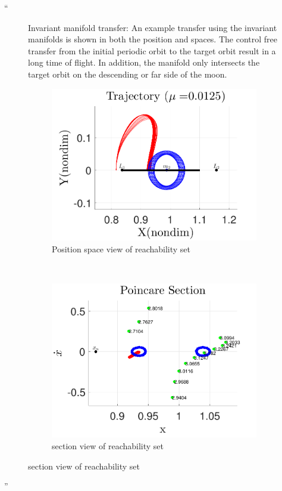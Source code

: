 \documentclass[11pt]{article}
\newenvironment{correction}{\begin{list}{}{\setlength{\leftmargin}{1cm}\setlength{\rightmargin}{1cm}}\vspace{\parsep}\item[]``}{''\end{list}}
\begin{document}
\begin{enumerate}
\begin{correction}
\begin{figure}[H]
        \caption{Invariant manifold transfer: An example transfer using the invariant manifolds is shown in both the position and \Poincare spaces.
        The control free transfer from the initial periodic orbit to the target orbit result in a long time of flight. 
    In addition, the manifold only intersects the target orbit on the descending or far side of the moon.}
\end{figure}
\begin{figure}[H]
        \centering 
        \begin{subfigure}[htbp]{0.5\textwidth} 
                \includegraphics[width=\textwidth]{reach_trajectory} 
                \caption{Position space view of reachability set}  
        \end{subfigure}~ %
        \begin{subfigure}[htbp]{0.5\textwidth} 
                \includegraphics[width=\textwidth]{poincare_compare} 
                \caption{\Poincare section view of reachability set}  
        \end{subfigure} %
                

\end{figure}
\end{correction}
\end{enumerate}
\end{document}
